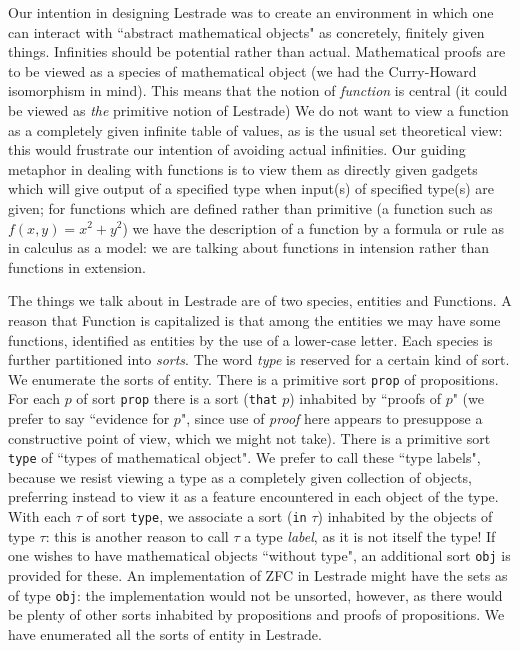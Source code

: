 \documentclass{article}
\begin{document}
 Our intention in designing Lestrade was to create an environment in which one can interact with ``abstract mathematical objects"  as concretely, finitely given things.  Infinities should be potential rather than actual.  Mathematical proofs are to be viewed as a species of mathematical object (we had the Curry-Howard isomorphism in mind).  This means that the notion of {\em function\/} is central (it could be viewed as {\em the\/} primitive notion of Lestrade)  We do not want to view a function as a completely given infinite table of values, as is the usual set theoretical view:  this would frustrate our intention of avoiding actual infinities.  Our guiding metaphor in dealing with functions is to view them as directly given gadgets which will give output of a specified type when input(s) of specified type(s) are given;  for functions which are defined rather than primitive (a function such as $f(x,y)=x^2+y^2$) we have the description of a function by a formula or rule as in calculus as a model:  we are talking about functions in intension rather than functions in extension.

The things we talk about in Lestrade are of two species, entities and Functions.  A reason that Function is capitalized is that among the entities we may have some functions, identified as entities by the use of a lower-case letter.  Each species is further partitioned into {\em sorts\/}.  The word {\em type\/} is reserved for a certain kind of sort.  We enumerate the sorts of entity.  There is a primitive sort {\tt prop} of propositions.  For each $p$ of sort
{\tt prop} there is a sort ({\tt that} $p$) inhabited by ``proofs of $p$" (we prefer to say ``evidence for $p$", since use of {\em proof\/} here appears to presuppose a constructive point of view, which we might not take).  There is a primitive sort {\tt type\/} of ``types of mathematical object".  We prefer to call these ``type labels", because we resist viewing a type as a completely given collection of objects, preferring instead to view it as a feature encountered in each object of the type.  With each $\tau$ of sort {\tt type}, we associate a sort ({\tt in} $\tau$) inhabited by the objects of type $\tau$:  this is another reason to call $\tau$ a type {\em label\/}, as it is not itself the type!  If one wishes to have mathematical objects ``without type", an additional sort {\tt obj} is provided for these.  An implementation of ZFC in Lestrade might have the sets as of type {\tt obj}:  the implementation would not be unsorted, however, as there would be plenty of other sorts inhabited by propositions and proofs of propositions.  We have enumerated all the sorts of entity in Lestrade.
\end{document}
